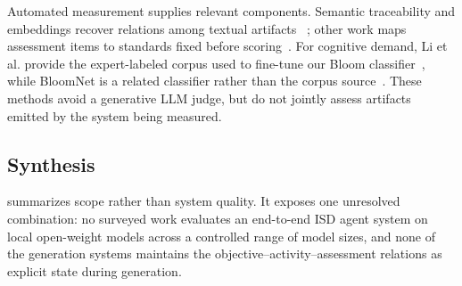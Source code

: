 Automated measurement supplies relevant components. Semantic traceability and
embeddings recover relations among textual artifacts
~\cite{clelandhuang2018traceability,feng2022labse}; other work maps assessment
items to standards fixed before scoring~\cite{xu2025itemalignment}. For cognitive
demand, Li et al. provide the expert-labeled corpus used to fine-tune our Bloom
classifier~\cite{li2022bloomclassification}, while BloomNet is a related classifier
rather than the corpus source~\cite{waheed2021bloomnet}. These methods avoid a
generative LLM judge, but do not jointly assess artifacts emitted by the system being
measured.

\subsection{Synthesis}

 summarizes scope rather than system quality. It exposes one
unresolved combination: no surveyed work evaluates an end-to-end ISD agent
system on local open-weight models across a controlled range of model sizes,
and none of the generation systems maintains the
objective--activity--assessment relations as explicit state during generation.
\begin{table}[t]
  \caption{Criteria-based positioning of related work. ISD = end-to-end agentic
  instructional design; Local = local/open-weight SLM as a design condition;
  Scale = controlled evaluation across model sizes; State = alignment relations
  kept as explicit, checkable state during generation.  = addressed;
   = not addressed; () = partially addressed.}
  \label{tab:related}
  \centering
  \small
\end{table}

